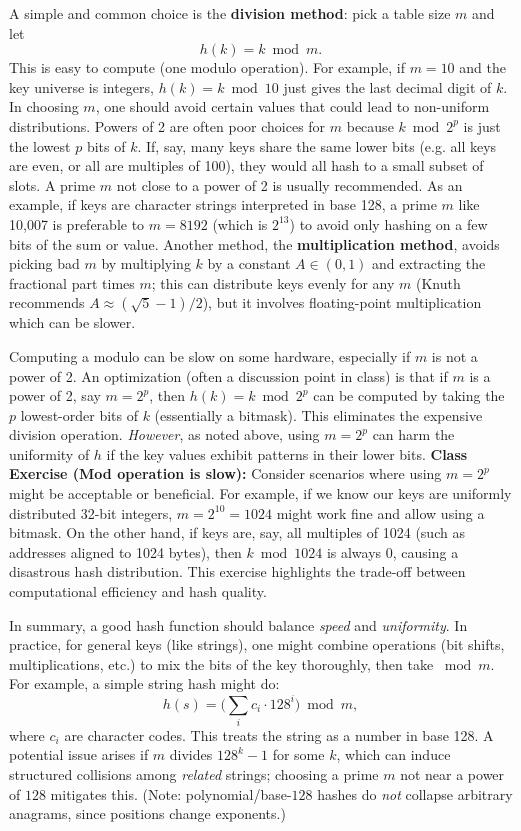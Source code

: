 \documentclass[11pt]{article}
\begin{document}
A simple and common choice is the \textbf{division method}: pick a table size $m$ and let 
\[ h(k) = k \bmod m. \] 
This is easy to compute (one modulo operation). For example, if $m=10$ and the key universe is integers, $h(k)=k \bmod 10$ just gives the last decimal digit of $k$. In choosing $m$, one should avoid certain values that could lead to non-uniform distributions. Powers of 2 are often poor choices for $m$ because $k \bmod 2^p$ is just the lowest $p$ bits of $k$. If, say, many keys share the same lower bits (e.g. all keys are even, or all are multiples of 100), they would all hash to a small subset of slots. A prime $m$ not close to a power of 2 is usually recommended. As an example, if keys are character strings interpreted in base 128, a prime $m$ like 10,007 is preferable to $m=8192$ (which is $2^{13}$) to avoid only hashing on a few bits of the sum or value. Another method, the \textbf{multiplication method}, avoids picking bad $m$ by multiplying $k$ by a constant $A \in (0,1)$ and extracting the fractional part times $m$; this can distribute keys evenly for any $m$ (Knuth recommends $A \approx (\sqrt{5}-1)/2$), but it involves floating-point multiplication which can be slower.

Computing a modulo can be slow on some hardware, especially if $m$ is not a power of 2. An optimization (often a discussion point in class) is that if $m$ is a power of 2, say $m=2^p$, then $h(k)=k \bmod 2^p$ can be computed by taking the $p$ lowest-order bits of $k$ (essentially a bitmask). This eliminates the expensive division operation. \emph{However}, as noted above, using $m=2^p$ can harm the uniformity of $h$ if the key values exhibit patterns in their lower bits. \textbf{Class Exercise (Mod operation is slow):} Consider scenarios where using $m=2^p$ might be acceptable or beneficial. For example, if we know our keys are uniformly distributed 32-bit integers, $m=2^{10}=1024$ might work fine and allow using a bitmask. On the other hand, if keys are, say, all multiples of 1024 (such as addresses aligned to 1024 bytes), then $k \bmod 1024$ is always 0, causing a disastrous hash distribution. This exercise highlights the trade-off between computational efficiency and hash quality.

In summary, a good hash function should balance \textit{speed} and \textit{uniformity}. In practice, for general keys (like strings), one might combine operations (bit shifts, multiplications, etc.) to mix the bits of the key thoroughly, then take $ \bmod m$. For example, a simple string hash might do:
\[ h(s) = \Big(\sum_{i} c_i \cdot 128^i \Big) \bmod m, \] 
where $c_i$ are character codes. This treats the string as a number in base 128. A potential issue arises if $m$ divides $128^{k}-1$ for some $k$, which can induce structured collisions among \emph{related} strings; choosing a prime $m$ not near a power of $128$ mitigates this. (Note: polynomial/base-$128$ hashes do \emph{not} collapse arbitrary anagrams, since positions change exponents.)
\end{document}

